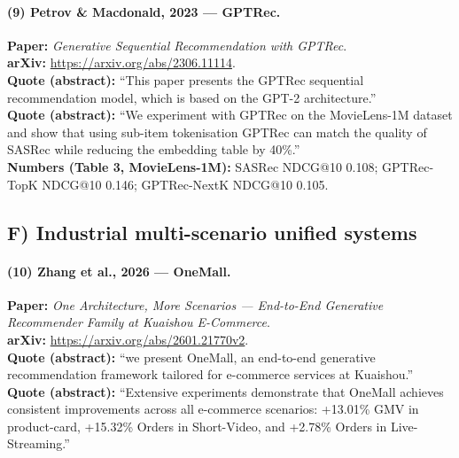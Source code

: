 \documentclass[11pt]{article}
\begin{document}
\paragraph{(9) Petrov \& Macdonald, 2023 --- GPTRec.}
\textbf{Paper:} \emph{Generative Sequential Recommendation with GPTRec}.\\
\textbf{arXiv:} \url{https://arxiv.org/abs/2306.11114}.\\
\textbf{Quote (abstract):} ``This paper presents the GPTRec sequential recommendation model, which is based on the GPT-2 architecture.''\\
\textbf{Quote (abstract):} ``We experiment with GPTRec on the MovieLens-1M dataset and show that using sub-item tokenisation GPTRec can match the quality of SASRec while reducing the embedding table by 40\%.''\\
\textbf{Numbers (Table 3, MovieLens-1M):} SASRec NDCG@10 0.108; GPTRec-TopK NDCG@10 0.146; GPTRec-NextK NDCG@10 0.105.

\subsection{F) Industrial multi-scenario unified systems}
\paragraph{(10) Zhang et al., 2026 --- OneMall.}
\textbf{Paper:} \emph{One Architecture, More Scenarios --- End-to-End Generative Recommender Family at Kuaishou E-Commerce}.\\
\textbf{arXiv:} \url{https://arxiv.org/abs/2601.21770v2}.\\
\textbf{Quote (abstract):} ``we present OneMall, an end-to-end generative recommendation framework tailored for e-commerce services at Kuaishou.''\\
\textbf{Quote (abstract):} ``Extensive experiments demonstrate that OneMall achieves consistent improvements across all e-commerce scenarios: +13.01\% GMV in product-card, +15.32\% Orders in Short-Video, and +2.78\% Orders in Live-Streaming.''
\end{document}
